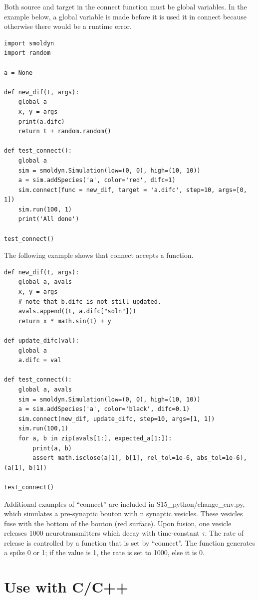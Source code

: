 \documentclass {book}
\begin{document}
Both source and target in the connect function must be global variables. In the example below, a global variable is made before it is used it in connect because otherwise there would be a runtime error.

\begin{lstlisting}[style=SSAPython]
import smoldyn
import random

a = None

def new_dif(t, args):
    global a
    x, y = args
    print(a.difc)
    return t + random.random()

def test_connect():
    global a
    sim = smoldyn.Simulation(low=(0, 0), high=(10, 10))
    a = sim.addSpecies('a', color='red', difc=1)
    sim.connect(func = new_dif, target = 'a.difc', step=10, args=[0, 1])
    sim.run(100, 1)
    print('All done')

test_connect()
\end{lstlisting}

The following example shows that connect accepts a function.

\begin{lstlisting}[style=SSAPython]
def new_dif(t, args):
    global a, avals
    x, y = args
    # note that b.difc is not still updated.
    avals.append((t, a.difc["soln"]))
    return x * math.sin(t) + y

def update_difc(val):
    global a
    a.difc = val

def test_connect():
    global a, avals
    sim = smoldyn.Simulation(low=(0, 0), high=(10, 10))
    a = sim.addSpecies('a', color='black', difc=0.1)
    sim.connect(new_dif, update_difc, step=10, args=[1, 1])
    sim.run(100,1)
    for a, b in zip(avals[1:], expected_a[1:]):
        print(a, b)
        assert math.isclose(a[1], b[1], rel_tol=1e-6, abs_tol=1e-6), (a[1], b[1])

test_connect()
\end{lstlisting}

Additional examples of ``connect'' are included in S15\_python/change\_env.py, which simulates a pre-synaptic bouton with n synaptic vesicles. These vesicles fuse with the bottom of the bouton (red surface). Upon fusion, one vesicle releases 1000 neurotransmitters which decay with time-constant $\tau$. The rate of release is controlled by a function that is set by ``connect''. The function generates a spike 0 or 1; if the value is 1, the rate is set to 1000, else it is 0.


\section{Use with C/C++}
\end{document}

